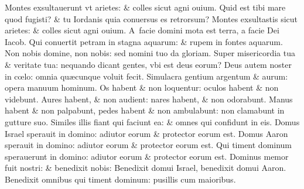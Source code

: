 \documentclass[a5paper,10pt]{book}
\def\ae{æ}
\def\oe{œ}
\begin{document}
\begin{multicols*}{2}
\newline \color{red} M\color{black}ontes exsultauerunt vt arietes: \& colles sicut agni ouium.
\newline \color{red} Q\color{black}uid est tibi mare quod fugisti? \& tu Iordanis quia conuersus es retrorsum?%
\newline \color{red} M\color{black}ontes exsultastis sicut arietes: \& colles sicut agni ouium.
\newline \color{red} A\color{black}\ facie domini mota est terra, a facie Dei Iacob.
\newline \color{red} Q\color{black}ui conuertit petram in stagna aquarum: \& rupem in fontes aquarum.
\newline \color{red} N\color{black}on nobis domine, non nobis: sed nomini tuo da gloriam.
\newline \color{red} S\color{black}uper misericordia tua \& veritate tua: nequando dicant gentes, vbi est deus eorum?
\newline \color{red} D\color{black}eus autem noster in c\oe lo: omnia qu\ae cunque voluit fecit.
\newline \color{red} S\color{black}imulacra gentium argentum \& aurum: opera manuum hominum.
\newline \color{red} O\color{black}s habent \& non loquentur: oculos habent \& non videbunt.
\newline \color{red} A\color{black}ures habent, \& non audient: nares habent, \& non odorabunt.
\newline \color{red} M\color{black}anus habent \& non palpabunt, pedes habent \& non ambulabunt: non clamabunt in gutture suo.
\newline \color{red} S\color{black}imiles illis fiant qui faciunt ea: \& omnes qui confidunt in eis.
\newline \color{red} D\color{black}omus Israel sperauit in domino: adiutor eorum \& protector eorum est.
\newline \color{red} D\color{black}omus Aaron sperauit in domino: adiutor eorum \& protector eorum est.
\newline \color{red} Q\color{black}ui timent dominum sperauerunt in domino: adiutor eorum \& protector eorum est.
\newline \color{red} D\color{black}ominus memor fuit nostri: \& benedixit nobis:
\newline \color{red} B\color{black}enedixit domui Israel, benedixit domui Aaron.
\newline \color{red} B\color{black}enedixit omnibus qui timent dominum: pusillis cum maioribus.

\end{multicols*}
\end{document}
